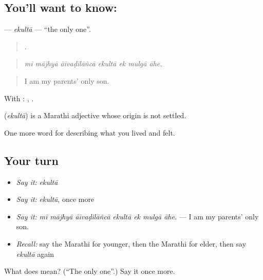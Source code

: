 \subsection*{You'll want to know: }
\textbf{} — \emph{ekultā} — \textquotedblleft{}the only one\textquotedblright{}.

\begin{quote}
      .
\end{quote}

\begin{quote}
\emph{mī mājhyā āīvaḍilāñcā ekultā ek mulgā āhe.}
\end{quote}

\begin{quote}
I am my parents' only son.
\end{quote}

With :   ,   .

\begin{cousinweb}
\textbf{} (\emph{ekultā}) is a Marathi adjective whose origin is not settled.
\end{cousinweb}

\begin{grammarlens}[title={What you've built}]
One more word for describing what you lived and felt.
\end{grammarlens}

\subsection*{Your turn}
\begin{itemize}
\raggedright
  \item \emph{Say it:} \emph{ekultā}
  \item \emph{Say it:} \emph{ekultā}, once more
  \item \emph{Say it:} \emph{mī mājhyā āīvaḍilāñcā ekultā ek mulgā āhe.} — I am my parents' only son.
  \item \emph{Recall:} say the Marathi for younger, then the Marathi for elder, then say \emph{ekultā} again
\end{itemize}

\begin{tcolorbox}[breakable,colback=teal!4,colframe=teal!35!black,title={Before you move on}]
What does  mean? (\textquotedblleft{}The only one\textquotedblright{}.) Say it once more.
\end{tcolorbox}

